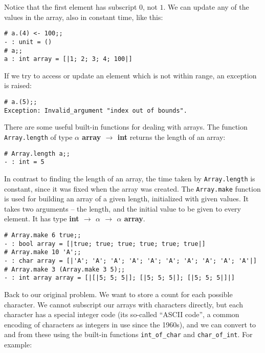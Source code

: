 \documentclass[]{book}
\newcommand{\smspace}{\vspace{4mm}}
\begin{document}
\noindent Notice that the first element has subscript $0$, not $1$. We can update any of the values in the array, also in constant time, like this:

\smspace
\noindent\verb!# a.(4) <- 100;;!\\
\noindent\verb!- : unit = ()!\\
\noindent\verb!# a;;!\\
\noindent\verb!a : int array = [|1; 2; 3; 4; 100|]!
\smspace

\noindent If we try to access or update an element which is not within range, an exception is raised:

\smspace
\noindent\verb!# a.(5);;!\\
\noindent\verb!Exception: Invalid_argument "index out of bounds".!
\smspace

\noindent There are some useful built-in functions for dealing with arrays. The function \texttt{Array.length} of type \textbf{\textsf{$\alpha$ array $\rightarrow$ int}} returns the length of an array:

\smspace
\noindent\verb!# Array.length a;;!\\
\noindent\verb!- : int = 5!
\smspace

\noindent In contrast to finding the length of an array, the time taken by \texttt{Array.length} is constant, since it was fixed when the array was created. The \texttt{Array.make} function is used for building an array of a given length, initialized with given values. It takes two arguments -- the length, and the initial value to be given to every element. It has type \textsf{\textbf{int $\rightarrow$ $\alpha$ $\rightarrow$ $\alpha$ array}}.

\smspace
\noindent\verb!# Array.make 6 true;;!\\
\noindent\verb!- : bool array = [|true; true; true; true; true; true|]!\\
\noindent\verb!# Array.make 10 'A';;!\\
\noindent\verb!- : char array = [|'A'; 'A'; 'A'; 'A'; 'A'; 'A'; 'A'; 'A'; 'A'; 'A'|]!\\
\noindent\verb!# Array.make 3 (Array.make 3 5);;!\\
\noindent\verb!- : int array array = [|[|5; 5; 5|]; [|5; 5; 5|]; [|5; 5; 5|]|]!
\smspace 

\noindent Back to our original problem. We want to store a count for each possible character. We cannot subscript our arrays with characters directly, but each character has a special integer code (its so-called ``ASCII code'', a common encoding of characters as integers in use since the 1960s), and we can convert to and from these using the built-in functions \texttt{int\_of\_char} and \texttt{char\_of\_int}. For example:
\end{document}
